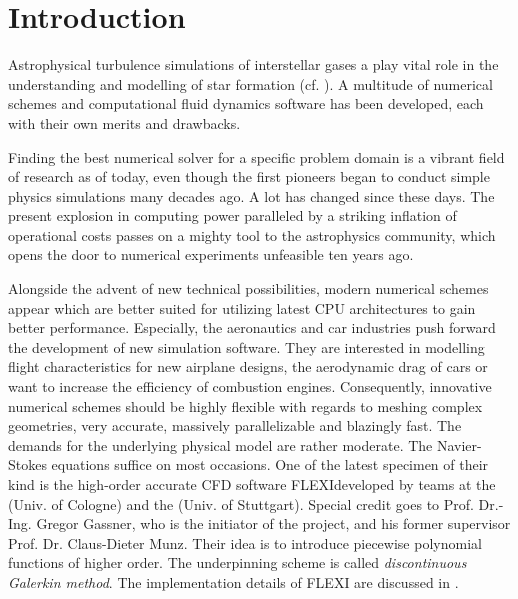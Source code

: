 \section{Introduction}

Astrophysical turbulence simulations of interstellar gases a play vital role in
the understanding and modelling of star formation (cf.
\cite{mac2004turbulence}). A multitude of numerical schemes and computational
fluid dynamics software has been developed, each with their own merits and
drawbacks.

Finding the best numerical solver for a specific problem domain is a vibrant
field of research as of today, even though the first pioneers began to conduct
simple physics simulations many decades ago. A lot has changed since these
days. The present explosion in computing power paralleled by a striking
inflation of operational costs passes on a mighty tool to the astrophysics
community, which opens the door to numerical experiments unfeasible ten years
ago.

Alongside the advent of new technical possibilities, modern numerical schemes
appear which are better suited for utilizing latest CPU architectures to gain
better performance. Especially, the aeronautics and car industries push forward
the development of new simulation software. They are interested in modelling
flight characteristics for new airplane designs, the aerodynamic drag of cars
or want to increase the efficiency of combustion engines. Consequently,
innovative numerical schemes should be highly flexible with regards to meshing
complex geometries, very accurate, massively parallelizable and blazingly fast.
The demands for the underlying physical model are rather moderate. The
Navier-Stokes equations suffice on most occasions. One of the latest specimen
of their kind is the high-order accurate CFD software FLEXI\footnotemark[1]
developed by teams at the  (Univ. of Cologne) and
the  (Univ. of Stuttgart).
Special credit goes to Prof. Dr.-Ing. Gregor Gassner, who is the initiator of
the project, and his former supervisor Prof.  Dr. Claus-Dieter Munz. Their idea
is to introduce piecewise polynomial functions of higher order. The
underpinning scheme is called \emph{discontinuous Galerkin method}. The
implementation details of FLEXI are discussed in
\cite{hindenlang2014mesh,hindenlang2012explicit,gassner2009discontinuous}.


